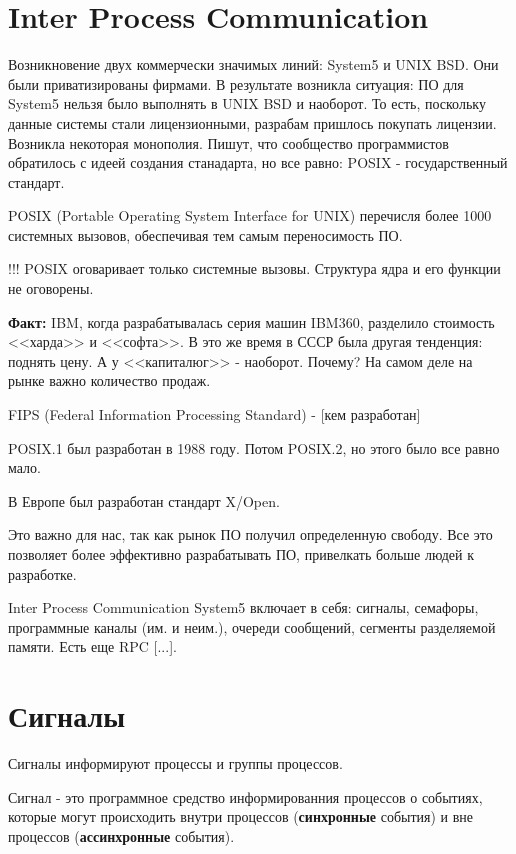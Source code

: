 \documentclass[a4paper, 12pt]{report}
\begin{document}
	\section*{Inter Process Communication}
	
	Возникновение двух коммерчески значимых линий: System5 и UNIX BSD. Они были приватизированы фирмами. В результате возникла ситуация: ПО для System5 нельзя было выполнять в UNIX BSD и наоборот. То есть, поскольку данные системы стали лицензионными, разрабам пришлось покупать лицензии. Возникла некоторая монополия. Пишут, что сообщество программистов обратилось с идеей создания станадарта, но все равно: POSIX - государственный стандарт.
	
	POSIX (Portable Operating System Interface for UNIX) перечисля более 1000 системных вызовов, обеспечивая тем самым переносимость ПО.
	
	!!! POSIX оговаривает только системные вызовы. Структура ядра и его функции не оговорены.
	
	\textbf{Факт:} IBM, когда разрабатывалась серия машин IBM360, разделило стоимость <<харда>> и <<софта>>. В это же время в СССР была другая тенденция: поднять цену. А у <<капиталюг>> - наоборот. Почему? На самом деле на рынке важно количество продаж.
	
	FIPS (Federal Information Processing Standard) - [кем разработан]
	
	POSIX.1 был разработан в 1988 году. Потом POSIX.2, но этого было все равно мало.
	
	В Европе был разработан стандарт X/Open.
	
	Это важно для нас, так как рынок ПО получил определенную свободу. Все это позволяет более эффективно разрабатывать ПО, привелкать больше людей к разработке.
	
	Inter Process Communication System5 включает в себя: сигналы, семафоры, программные каналы (им. и неим.), очереди сообщений, сегменты разделяемой памяти. Есть еще RPC [...].
	
	\section*{Сигналы}
	
	Сигналы информируют процессы и группы процессов.
	
	Сигнал - это программное средство информированния процессов о событиях, которые могут происходить внутри процессов (\textbf{синхронные} события) и  вне процессов (\textbf{ассинхронные} события).
	
\end{document}
